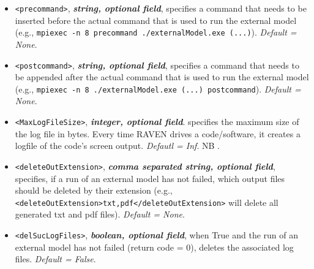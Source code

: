 \begin{itemize}
\item \texttt{<precommand>}, \textbf{\textit{string, optional field}}, specifies
a command that needs to be inserted before the actual command that is used to
run the external model (e.g., \texttt{mpiexec -n 8 precommand
./externalModel.exe (...)}).
%
\textit{Default = None}.

\item \texttt{<postcommand>}, \textbf{\textit{string, optional field}},
specifies a command that needs to be appended after the actual command that is
used to run the external model (e.g., \texttt{mpiexec -n 8  ./externalModel.exe
(...) postcommand}).
%
\textit{Default = None}.

\item \texttt{<MaxLogFileSize>}, \textbf{\textit{integer, optional field}}.
specifies the maximum size of the log file in bytes. Every time RAVEN drives a
code/software, it creates a logfile of the code's screen output.
%
\textit{Defautl = Inf}. NB . 

\item \texttt{<deleteOutExtension>}, \textbf{\textit{comma separated string,
optional field}}, specifies, if a run of an external model has not failed, which
output files should be deleted by their extension (e.g.,
\texttt{<deleteOutExtension>txt,pdf</deleteOutExtension>} will delete all
generated txt and pdf files).
%
\textit{Default = None}.

\item \texttt{<delSucLogFiles>}, \textbf{\textit{boolean, optional field}}, when
True and the run of an external model has not failed (return code = 0), deletes
the associated log files.
%
\textit{Default = False}.

\end{itemize}

